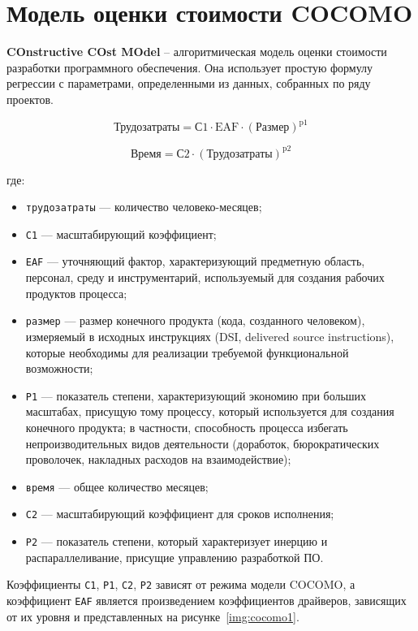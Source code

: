 \section{Модель оценки стоимости COCOMO}

\textbf{COnstructive COst MOdel} -- алгоритмическая модель оценки стоимости разработки программного обеспечения. Она использует простую формулу регрессии с параметрами, определенными из данных, собранных по ряду проектов.

\begin{equation}
    \text{Трудозатраты} = \text{С1} \cdot \text{EAF} \cdot (\text{Размер})^{\text{p1}}
\end{equation}

\begin{equation}
    \text{Время} = \text{С2} \cdot (\text{Трудозатраты})^{\text{p2}}
\end{equation}

\noindent где:

\begin{itemize}
    \item \texttt{трудозатраты} --- количество человеко-месяцев;
    \item \texttt{С1} --- масштабирующий коэффициент;
    \item \texttt{EAF} --- уточняющий фактор, характеризующий предметную область,
    персонал, среду и инструментарий, используемый для создания рабочих
    продуктов процесса;
    \item \texttt{размер} --- размер конечного продукта (кода, созданного
    человеком), измеряемый в исходных инструкциях (DSI, delivered source
    instructions), которые необходимы для реализации требуемой функциональной
    возможности;
    \item \texttt{P1} --- показатель степени, характеризующий экономию при
        больших масштабах, присущую тому процессу, который используется для
        создания конечного продукта; в частности, способность процесса избегать
        непроизводительных видов деятельности (доработок, бюрократических
        проволочек, накладных расходов на взаимодействие);
    \item \texttt{время} --- общее количество месяцев;
    \item \texttt{С2} --- масштабирующий коэффициент для сроков исполнения;
    \item \texttt{Р2} --- показатель степени, который характеризует инерцию и
    распараллеливание, присущие управлению разработкой ПО.
\end{itemize}

Коэффициенты \texttt{C1}, \texttt{P1}, \texttt{C2}, \texttt{P2} зависят от
режима модели COCOMO, а коэффициент \texttt{EAF} является произведением
коэффициентов драйверов, зависящих от их уровня и представленных на
рисунке~\ref{img:cocomo1}.

